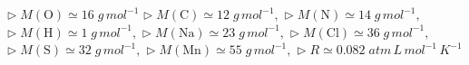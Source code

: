 \documentclass[a4paper,addpoints,12pt]{exam}
\newcommand*\chem[1]{\ensuremath{\mathrm{#1}}}
\newcommand{\halmos}{\vspace*{-6mm}
	
					\begin{flushright}
						\rule{1mm}{2.5mm} 
					\end{flushright}
					\vspace*{-4mm}
						
					  }
\renewcommand{\qed}{\halmos}
\begin{document}


\vspace*{\fill}

\begin{learn}
{$\triangleright\; M(\chem{O})\simeq16\;g\,mol^{-1}$\newline
$\triangleright\; M(\chem{C})\simeq12\;g\,mol^{-1},$\newline
$\triangleright\; M(\chem{N})\simeq14\;g\,mol^{-1},$\newline
$\triangleright\; M(\chem{H})\simeq1\;g\,mol^{-1},$\newline
$\triangleright\; M(\chem{Na})\simeq 23\;g\,mol^{-1},$\newline
$\triangleright\; M(\chem{Cl})\simeq 36\;g\,mol^{-1},$\newline
$\triangleright\; M(\chem{S})\simeq32\;g\,mol^{-1},$\newline
$\triangleright\; M(\chem{Mn})\simeq55\;g\,mol^{-1},$\newline
$\triangleright\; R\simeq 0.082\;atm\,L\,mol^{-1}\,K^{-1}$
}
\end{learn}	
		

\newpage
{}
\end{document}
